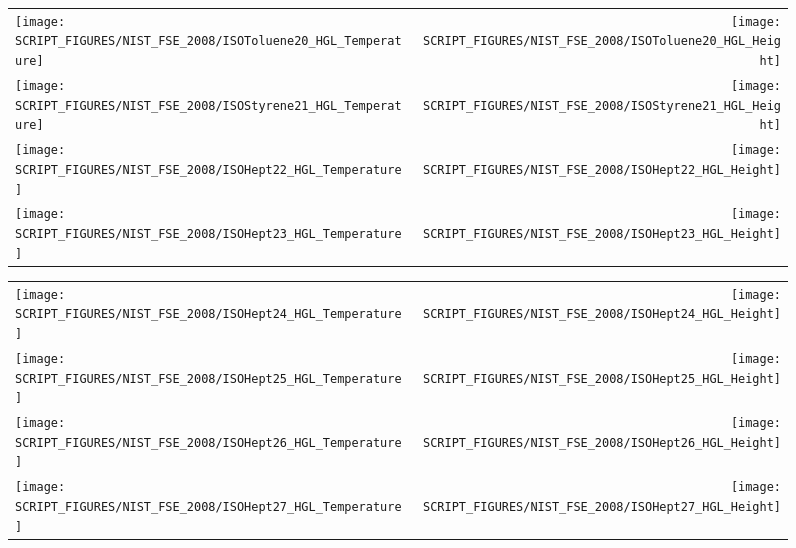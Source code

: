 \begin{figure}[p]
\begin{tabular*}{\textwidth}{l@{\extracolsep{\fill}}r}
\texttt{[image: SCRIPT\_FIGURES/NIST\_FSE\_2008/ISOToluene20\_HGL\_Temperature]} &
\texttt{[image: SCRIPT\_FIGURES/NIST\_FSE\_2008/ISOToluene20\_HGL\_Height]} \\
\texttt{[image: SCRIPT\_FIGURES/NIST\_FSE\_2008/ISOStyrene21\_HGL\_Temperature]} &
\texttt{[image: SCRIPT\_FIGURES/NIST\_FSE\_2008/ISOStyrene21\_HGL\_Height]} \\
\texttt{[image: SCRIPT\_FIGURES/NIST\_FSE\_2008/ISOHept22\_HGL\_Temperature]} &
\texttt{[image: SCRIPT\_FIGURES/NIST\_FSE\_2008/ISOHept22\_HGL\_Height]} \\
\texttt{[image: SCRIPT\_FIGURES/NIST\_FSE\_2008/ISOHept23\_HGL\_Temperature]} &
\texttt{[image: SCRIPT\_FIGURES/NIST\_FSE\_2008/ISOHept23\_HGL\_Height]}
\end{tabular*}
\label{NIST_FSE_2008_HGL_Temp_4}
\end{figure}

\begin{figure}[p]
\begin{tabular*}{\textwidth}{l@{\extracolsep{\fill}}r}
\texttt{[image: SCRIPT\_FIGURES/NIST\_FSE\_2008/ISOHept24\_HGL\_Temperature]} &
\texttt{[image: SCRIPT\_FIGURES/NIST\_FSE\_2008/ISOHept24\_HGL\_Height]} \\
\texttt{[image: SCRIPT\_FIGURES/NIST\_FSE\_2008/ISOHept25\_HGL\_Temperature]} &
\texttt{[image: SCRIPT\_FIGURES/NIST\_FSE\_2008/ISOHept25\_HGL\_Height]} \\
\texttt{[image: SCRIPT\_FIGURES/NIST\_FSE\_2008/ISOHept26\_HGL\_Temperature]} &
\texttt{[image: SCRIPT\_FIGURES/NIST\_FSE\_2008/ISOHept26\_HGL\_Height]} \\
\texttt{[image: SCRIPT\_FIGURES/NIST\_FSE\_2008/ISOHept27\_HGL\_Temperature]} &
\texttt{[image: SCRIPT\_FIGURES/NIST\_FSE\_2008/ISOHept27\_HGL\_Height]}
\end{tabular*}
\label{NIST_FSE_2008_HGL_Temp_5}
\end{figure}

